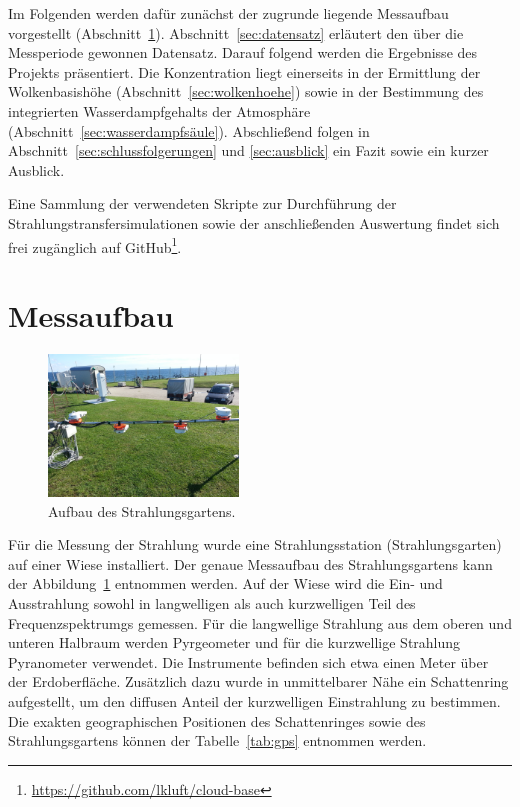 \documentclass[10pt,a4paper,compsoc,peer review papers]{IEEEtran}
\begin{document}
Im Folgenden werden dafür zunächst der zugrunde liegende Messaufbau vorgestellt
(Abschnitt~\ref{sec:aufbau}). Abschnitt~\ref{sec:datensatz} erläutert
den über die Messperiode gewonnen Datensatz. Darauf folgend werden die
Ergebnisse des Projekts präsentiert. Die Konzentration liegt einerseits in der
Ermittlung der Wolkenbasishöhe (Abschnitt~\ref{sec:wolkenhoehe}) sowie in der
Bestimmung des integrierten Wasserdampfgehalts der Atmosphäre
(Abschnitt~\ref{sec:wasserdampfsäule}). Abschließend folgen in
Abschnitt~\ref{sec:schlussfolgerungen} und \ref{sec:ausblick} ein Fazit sowie
ein kurzer Ausblick.

Eine Sammlung der verwendeten Skripte zur Durchführung der 
Strahlungstransfersimulationen sowie der anschließenden Auswertung findet sich 
frei zugänglich auf GitHub\footnote{\url{https://github.com/lkluft/cloud-base}}.

\section{Messaufbau}\label{sec:aufbau}

\begin{figure}[ht]
  \centering
  \includegraphics[angle=180,width=0.45\textwidth]{figures/aufbau.jpg}
  \caption{Aufbau des Strahlungsgartens.}
  \label{fig:aufbau}
\end{figure}

Für die Messung der Strahlung wurde eine Strahlungsstation (Strahlungsgarten)
auf einer Wiese installiert. Der genaue Messaufbau des Strahlungsgartens kann
der Abbildung~\ref{fig:aufbau} entnommen werden. Auf der Wiese wird
die Ein- und Ausstrahlung sowohl in langwelligen als auch kurzwelligen Teil
des Frequenzspektrumgs gemessen. Für die langwellige Strahlung aus dem oberen
und unteren Halbraum werden Pyrgeometer und für die kurzwellige Strahlung
Pyranometer verwendet. Die Instrumente befinden sich etwa einen Meter über der
Erdoberfläche. Zusätzlich dazu wurde in unmittelbarer Nähe ein Schattenring
aufgestellt, um den diffusen Anteil der kurzwelligen Einstrahlung zu bestimmen.
Die exakten geographischen Positionen des Schattenringes sowie des
Strahlungsgartens können der Tabelle~\ref{tab:gps} entnommen werden.
\end{document}
